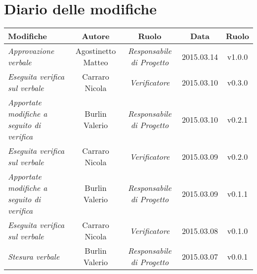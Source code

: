 \newpage
\section*{Diario delle modifiche}

\begin{table}[h]
\centering
\begin{tabular}{|p{}|c|c|c|c|}
	\toprule
		\textbf{Modifiche} & \textbf{Autore} & \textbf{Ruolo} & \textbf{Data} & \textbf{Ruolo} \\
	\midrule
	\midrule
		\textit{Approvazione verbale} & Agostinetto Matteo & \textit{Responsabile di Progetto} & 2015.03.14 & v1.0.0 \\
	\midrule
		\textit{Eseguita verifica sul verbale} & Carraro Nicola & \textit{Verificatore} & 2015.03.10 & v0.3.0 \\ 										
	\midrule
		\textit{Apportate modifiche a seguito di verifica} & Burlin Valerio & \textit{Responsabile di Progetto} & 2015.03.10 & v0.2.1 \\
	\midrule
		\textit{Eseguita verifica sul verbale} & Carraro Nicola & \textit{Verificatore} & 2015.03.09 & v0.2.0 \\
	\midrule
		\textit{Apportate modifiche a seguito di verifica} & Burlin Valerio & \textit{Responsabile di Progetto} & 2015.03.09 & v0.1.1 \\
	\midrule
		\textit{Eseguita verifica sul verbale} & Carraro Nicola & \textit{Verificatore} & 2015.03.08 & v0.1.0 \\
	\midrule
		\textit{Stesura verbale} & Burlin Valerio & \textit{Responsabile di Progetto} & 2015.03.07 & v0.0.1 \\
	\bottomrule
\end{tabular}	
\end{table}

\newpage